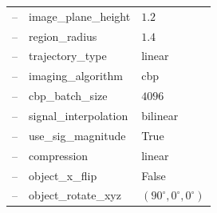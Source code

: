 \documentclass[sensors,article,submit,moreauthors]{Definitions/mdpi}
\begin{document}
\begin{table}[H]
\begin{tabular}{lll}
\multicolumn{1}{c}{--} & image\_plane\_height   & $1.2$ \\
\multicolumn{1}{c}{--} & region\_radius         & $1.4$ \\
\multicolumn{1}{c}{--} & trajectory\_type       & linear \\
\multicolumn{1}{c}{--} & imaging\_algorithm     & cbp \\
\multicolumn{1}{c}{--} & cbp\_batch\_size       & $4096$ \\
\multicolumn{1}{c}{--} & signal\_interpolation  & bilinear \\
\multicolumn{1}{c}{--} & use\_sig\_magnitude    & True \\
\multicolumn{1}{c}{--} & compression            & linear \\
\multicolumn{1}{c}{--} & object\_x\_flip        & False \\
\multicolumn{1}{c}{--} & object\_rotate\_xyz    & $(90^\circ, 0^\circ, 0^\circ)$
\\
\bottomrule
\end{tabular}
\end{table}
\end{document}
